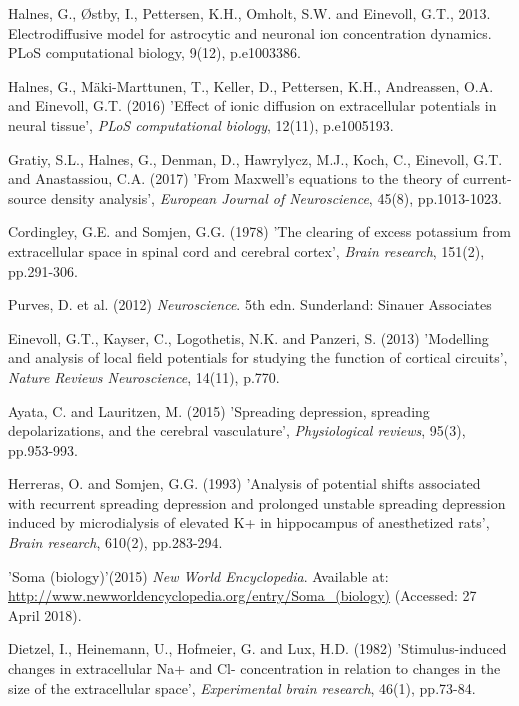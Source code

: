 \documentclass{uiophd}
\begin{document}
\begin{thebibliography}{1}

Halnes, G., Østby, I., Pettersen, K.H., Omholt, S.W. and Einevoll, G.T., 2013. Electrodiffusive model for astrocytic and neuronal ion concentration dynamics. PLoS computational biology, 9(12), p.e1003386.

Halnes, G., Mäki-Marttunen, T., Keller, D., Pettersen, K.H., Andreassen, O.A. and Einevoll, G.T. (2016) 'Effect of ionic diffusion on extracellular potentials in neural tissue', \textit{PLoS computational biology}, 12(11), p.e1005193.

Gratiy, S.L., Halnes, G., Denman, D., Hawrylycz, M.J., Koch, C., Einevoll, G.T. and Anastassiou, C.A. (2017) 'From Maxwell's equations to the theory of current-source density analysis', \textit{European Journal of Neuroscience}, 45(8), pp.1013-1023.

Cordingley, G.E. and Somjen, G.G. (1978) 'The clearing of excess potassium from extracellular space in spinal cord and cerebral cortex', \textit{Brain research}, 151(2), pp.291-306.

Purves, D. et al. (2012) \textit{Neuroscience}. 5th edn.
Sunderland: Sinauer Associates

Einevoll, G.T., Kayser, C., Logothetis, N.K. and Panzeri, S. (2013) 'Modelling and analysis of local field potentials for studying the function of cortical circuits', \textit{Nature Reviews Neuroscience}, 14(11), p.770.

Ayata, C. and Lauritzen, M. (2015) 'Spreading depression, spreading depolarizations, and the cerebral vasculature', \textit{Physiological reviews}, 95(3), pp.953-993.

Herreras, O. and Somjen, G.G. (1993) 'Analysis of potential shifts associated with recurrent spreading depression and prolonged unstable spreading depression induced by microdialysis of elevated K+ in hippocampus of anesthetized rats', \textit{Brain research}, 610(2), pp.283-294.

'Soma (biology)'(2015) \textit{New World Encyclopedia}. Available at:
\url{http://www.newworldencyclopedia.org/entry/Soma\_(biology)} (Accessed: 27 April 2018).

Dietzel, I., Heinemann, U., Hofmeier, G. and Lux, H.D. (1982) 'Stimulus-induced changes in extracellular Na+ and Cl- concentration in relation to changes in the size of the extracellular space', \textit{Experimental brain research}, 46(1), pp.73-84.


\end{thebibliography}
\end{document}
